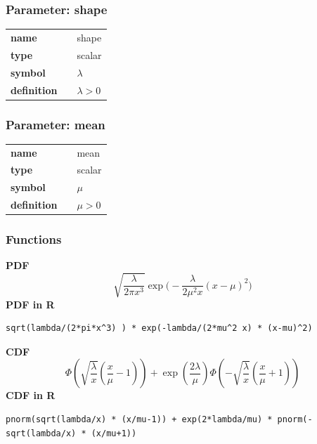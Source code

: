 \subsubsection*{Parameter: shape}

\noindent\begin{tabular}{p{2cm}cl}
\textbf{name} & & shape \\
\textbf{type} & & scalar \\
\textbf{symbol} & & $\lambda$  \\
\textbf{definition} & & $\lambda > 0$
\end{tabular}
\subsubsection*{Parameter: mean}

\noindent\begin{tabular}{p{2cm}cl}
\textbf{name} & & mean \\
\textbf{type} & & scalar \\
\textbf{symbol} & & $\mu$  \\
\textbf{definition} & & $\mu > 0$
\end{tabular}
\subsubsection*{Functions}

\smallskip \noindent \hspace{.2cm} \textbf{PDF} 
\begin{equation*}\sqrt{\frac{\lambda}{2\pi x^3}} \exp\Big(-\frac{\lambda}{2\mu^2 x}(x-\mu)^2\Big)\end{equation*}
\smallskip \noindent \hspace{.2cm} \textbf{PDF in R}  
\begin{verbatim}sqrt(lambda/(2*pi*x^3) ) * exp(-lambda/(2*mu^2 x) * (x-mu)^2)\end{verbatim}
\smallskip \noindent \hspace{.2cm} \textbf{CDF} 
\begin{equation*}\Phi\left(\sqrt{\frac{\lambda}{x}} \left(\frac{x}{\mu}-1 \right)\right) +\exp\left(\frac{2 \lambda}{\mu}\right) \Phi\left(-\sqrt{\frac{\lambda}{x}}\left(\frac{x}{\mu}+1 \right)\right)\end{equation*}
\smallskip \noindent \hspace{.2cm} \textbf{CDF in R} 
\begin{verbatim}pnorm(sqrt(lambda/x) * (x/mu-1)) + exp(2*lambda/mu) * pnorm(-sqrt(lambda/x) * (x/mu+1))\end{verbatim}
\smallskip

